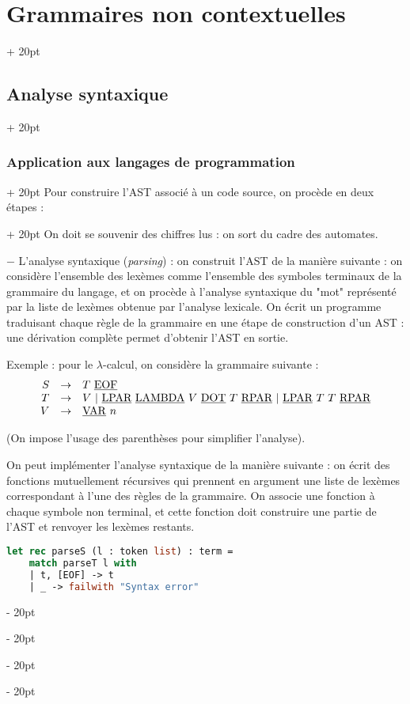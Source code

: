 \documentclass[a4paper, 12pt, twoside]{article}
\newcommand{\ind}[1][20pt]{\advance\leftskip + #1}
\newcommand{\deind}[1][20pt]{\advance\leftskip - #1}
\newenvironment{indt}[2][20pt]{#2 \par \ind[#1]}{\par \deind} %
\begin{document}
\begin{indt}{\section{Grammaires non contextuelles}}
\begin{indt}{\subsection{Analyse syntaxique}}
\begin{indt}{\subsubsection{Application aux langages de programmation}}
\begin{indt}{Pour construire l'AST associé à un code source, on procède en deux étapes :}
                    On doit se souvenir des chiffres lus : on sort du cadre des automates.

                    \vspace{12pt}
                    
                    $-$ L'analyse syntaxique (\textit{parsing}) : on construit l'AST de la manière suivante : on considère l'ensemble des lexèmes comme l'ensemble des symboles terminaux de la grammaire du langage, et on procède à l'analyse syntaxique du "mot" représenté par la liste de lexèmes obtenue par l'analyse lexicale.
                    On écrit un programme traduisant chaque règle de la grammaire en une étape de construction d'un AST : une dérivation complète permet d'obtenir l'AST en sortie.

                    \vspace{6pt}
                    
                    Exemple : pour le $\lambda$-calcul, on considère la grammaire suivante :
                    \[
                        \begin{array}{rcl}
                            S & \rightarrow & T\ \underbar{\rm{EOF}}
                            \\
                            T & \rightarrow & V\ |\ \underbar{\rm LPAR}\ \underbar{\rm LAMBDA}\ V\ \underbar{\rm DOT}\ T\ \underbar{\rm RPAR}\ |\ \underbar{\rm LPAR}\ T\ T\ \underbar{\rm RPAR}
                            \\
                            V & \rightarrow & \underline{\rm VAR}\ n
                        \end{array}
                    \]

                    (On impose l'usage des parenthèses pour simplifier l'analyse).

                    On peut implémenter l'analyse syntaxique de la manière suivante : on écrit des fonctions mutuellement récursives qui prennent en argument une liste de lexèmes correspondant  à l'une des règles de la grammaire.
                    On associe une fonction à chaque symbole non terminal, et cette fonction doit construire une partie de l'AST et renvoyer les lexèmes restants.

                    \begin{lstlisting}[language=Caml, xleftmargin=100pt]
let rec parseS (l : token list) : term =
    match parseT l with
    | t, [EOF] -> t
    | _ -> failwith "Syntax error"


\end{lstlisting}
\end{indt}
\end{indt}
\end{indt}
\end{indt}
\end{document}
